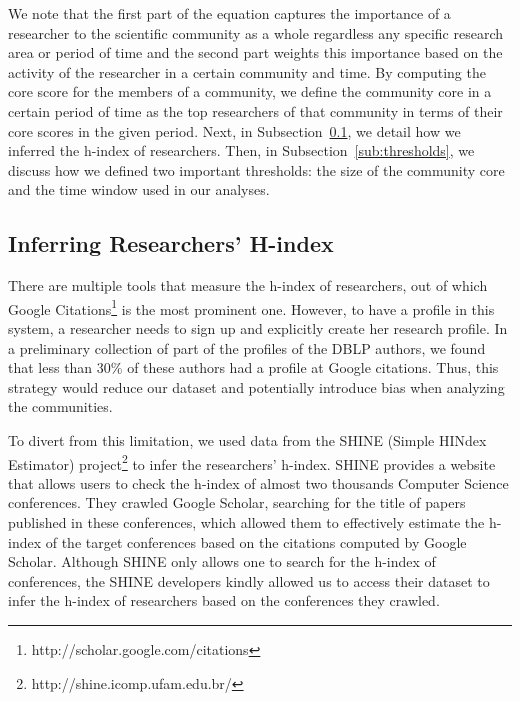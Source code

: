 
We note that the first part of the equation captures the importance of a researcher to the scientific community as a whole regardless any specific research area or period of time and the second part weights this
importance based on the activity of the researcher in a certain community and time.  By computing the core score for the members of a community, we define the community core in a
certain period of time as the top researchers of that community in terms of their core scores in the given period. Next, in Subsection~\ref{sub:hindex}, we detail how we inferred the
h-index of researchers. 
Then, in Subsection~\ref{sub:thresholds}, we discuss how we defined two important thresholds: the size of the community core and the time window used in our analyses.


\subsection{Inferring Researchers' H-index}
\label{sub:hindex}

There are multiple tools that measure the h-index of researchers, out of which Google Citations\footnote{http://scholar.google.com/citations} is the most prominent one.
However, to have a profile in this system, a researcher needs to sign up and explicitly create her research profile.  In a preliminary collection of part of the profiles of
the DBLP authors, we found that less than 30\% of these authors had a profile at Google citations. Thus, this strategy would reduce our dataset and
potentially introduce bias when analyzing the communities.
 
To divert from this limitation, we used data from the SHINE (Simple HINdex Estimator) project\footnote{http://shine.icomp.ufam.edu.br/} to infer the researchers' h-index.
SHINE provides a website that allows users to check the h-index of almost two thousands Computer Science conferences. They crawled Google Scholar, searching for the title of papers
published in these conferences, which allowed them to effectively estimate the h-index of the target conferences based on the citations computed by Google Scholar. Although
SHINE only allows one to search for the h-index of conferences, the SHINE developers kindly allowed us to access their dataset to infer the h-index of researchers based on the
conferences they crawled.


